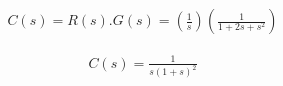 \item
%



\begin{multline}
C(s) = R(s).G(s) = (\frac{1}{s})  (\frac{1}{1+2s+s^2})
\end{multline}

\begin{multline}
C(s) =  \frac{1}{s(1+s)^2}
\end{multline}

    
